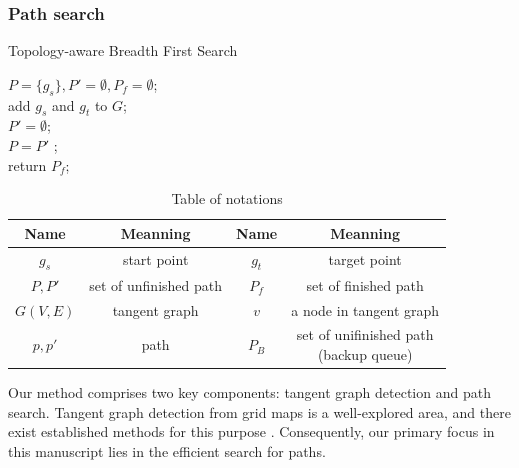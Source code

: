 \documentclass[lettersize,journal]{IEEEtran}
\begin{document}
\subsubsection{Path search} 



\begin{algorithm}[t] 
 \normalem
\label{a1}
  \caption{Topology-aware Breadth First Search}
  $P = \{g_s\}, P' = \emptyset, P_f = \emptyset$; \\
  add $g_s$ and $g_t$ to $G$; \\
   {
  	 $P' = \emptyset$; \\
      {
     }
     $P = P'$ ; \\		  
  } 
  return $P_f$;
\end{algorithm}

\begin{table}[t]
	\centering  %
	\caption{Table of notations}  %
	\label{table_of_notation}  %
	\begin{tabular}{|c|c|c|c|}  
		\hline 
		Name & Meanning & Name & Meanning \\  
		\hline
		$g_s$   & start point & $g_t$ & target point \\
		\hline
		$P, P'$ & set of unfinished path & $P_f$ & set of finished path \\
		\hline		
		$G(V, E)$ & tangent graph & $v$ & a node in tangent graph \\
		\hline		
		$p, p'$ & path & $P_B$ & \makecell[c]{set of unifinished path \\ (backup queue)} \\
		\hline
	\end{tabular}
\end{table}

Our method comprises two key components: tangent graph detection and path search. Tangent graph detection from grid maps is a well-explored area, and there exist established methods for this purpose \cite{131594, yao2019reinforcedrimjump, oh2017edge}. Consequently, our primary focus in this manuscript lies in the efficient search for paths.
\end{document}
